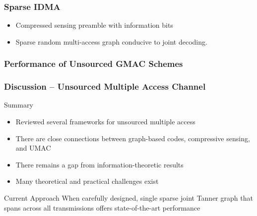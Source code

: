 \documentclass[10pt]{beamer}
\begin{document}
\begin{frame}
\frametitle{Sparse IDMA}
\begin{center}
\scalebox{0.9}{}
\end{center}
  \begin{itemize}
  \item Compressed sensing preamble with information bits
  \item Sparse random multi-access graph conducive to joint decoding.
  \end{itemize}
\end{frame}


\begin{frame}
\frametitle{Performance of Unsourced GMAC Schemes}
\begin{center}

\end{center}
\end{frame}


\begin{frame}
\frametitle{Discussion -- Unsourced Multiple Access Channel}

\begin{block}{Summary}
\begin{itemize}
\item Reviewed several frameworks for unsourced multiple access
\item There are close connections between graph-based codes, compressive sensing, and UMAC
\item There remains a gap from information-theoretic results
\item Many theoretical and practical challenges exist
\end{itemize}
\end{block}
\begin{block}{Current Approach}
When carefully designed, single sparse joint Tanner graph that spans across all transmissions offers state-of-the-art performance
\end{block}
\begin{center}
\end{center}
\end{frame}
\end{document}
